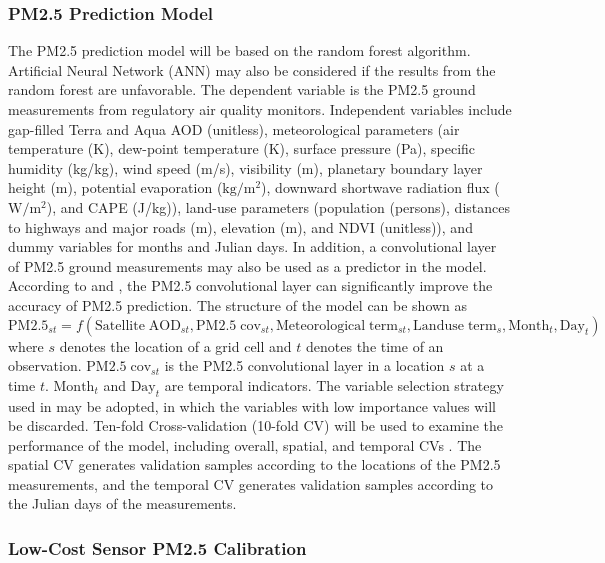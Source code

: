 \documentclass[11pt]{article}
\begin{document}
\subsubsection{PM2.5 Prediction Model}
The PM2.5 prediction model will be based on the random forest algorithm. Artificial Neural Network (ANN) may also be considered if the results from the random forest are unfavorable. The dependent variable is the PM2.5 ground measurements from regulatory air quality monitors. Independent variables include gap-filled Terra and Aqua AOD (unitless), meteorological parameters (air temperature (K), dew-point temperature (K), surface pressure (Pa), specific humidity (kg/kg), wind speed (m/s), visibility (m), planetary boundary layer height (m), potential evaporation ($\mathrm{kg/m^2}$), downward shortwave radiation flux ($\mathrm{W/m^2}$), and CAPE (J/kg)), land-use parameters (population (persons), distances to highways and major roads (m), elevation (m), and NDVI (unitless)), and dummy variables for months and Julian days. In addition, a convolutional layer of PM2.5 ground measurements may also be used as a predictor in the model. According to \citet{Di2016} and \citet{Hu2017}, the PM2.5 convolutional layer can significantly improve the accuracy of PM2.5 prediction. The structure of the model can be shown as
\begin{equation}
\label{emu:pm25}
\mathrm{
PM2.5_{\mathit{st}}=\mathit{f}(Satellite\;AOD_{\mathit{st}},PM2.5\;cov_{\mathit{st}},Meteorological\;term_{\mathit{st}},Landuse\;term_\mathit{s},Month_\mathit{t}, Day_\mathit{t})
}
\end{equation}
where $s$ denotes the location of a grid cell and $t$ denotes the time of an observation. $\mathrm{PM2.5\;cov_{\mathit{st}}}$ is the PM2.5 convolutional layer in a location $s$ at a time $t$. $\mathrm{Month_\mathit{t}}$ and $\mathrm{Day_\mathit{t}}$ are temporal indicators. The variable selection strategy used in \citet{Hu2017} may be adopted, in which the variables with low importance values will be discarded. Ten-fold Cross-validation (10-fold CV) will be used to examine the performance of the model, including overall, spatial, and temporal CVs \citep{Hu2017, Xiao2017}. The spatial CV generates validation samples according to the locations of the PM2.5 measurements, and the temporal CV generates validation samples according to the Julian days of the measurements. 

\subsubsection{Low-Cost Sensor PM2.5 Calibration}
\end{document}
